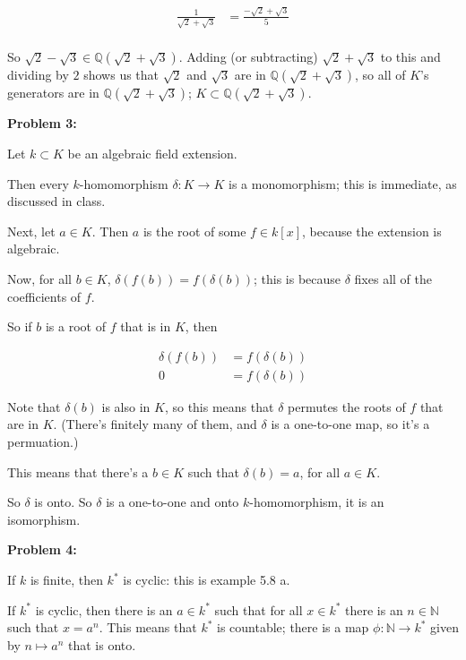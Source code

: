 \documentclass[a4paper,12pt]{article}
\newcommand{\shunt}{\vspace{20mm}}
\newcommand{\de}{\delta}
\newcommand{\N}{\mathbb{N}}
\newcommand{\Q}{\mathbb{Q}}
\begin{document}
\begin{align*}
\frac{1}{\sqrt{2}+\sqrt{3}} &= \frac{-\sqrt{2}+\sqrt{3}}{5}\\
\end{align*}

So $\sqrt{2}-\sqrt{3} \in \Q(\sqrt{2}+\sqrt{3})$. Adding (or subtracting) $\sqrt{2}+\sqrt{3}$ to this and dividing by $2$ shows us that $\sqrt{2}$ and $\sqrt{3}$ are in $\Q(\sqrt{2}+\sqrt{3})$, so all of $K$'s generators are in $\Q(\sqrt{2}+\sqrt{3})$; $K \subset \Q(\sqrt{2}+\sqrt{3})$.

\shunt

{\bf Problem 3:} 

Let $k \subset K$ be an algebraic field extension.

Then every $k$-homomorphism $\de: K \to K$ is a monomorphism; this is immediate, as discussed in class.

Next, let $a \in K$. Then $a$ is the root of some $f \in k[x]$, because the extension is algebraic.

Now, for all $b \in K$, $\de(f(b)) = f(\de(b))$; this is because $\de$ fixes all of the coefficients of $f$.

So if $b$ is a root of $f$ that is in $K$, then 

\begin{align*}
\de(f(b)) &= f(\de(b)) \\
0 &= f(\de(b))
\end{align*}

Note that $\de(b)$ is also in $K$, so this means that $\de$ permutes the roots of $f$ that are in $K$. (There's finitely many of them, and $\de$ is a one-to-one map, so it's a permuation.)

This means that there's a $b \in K$ such that $\de(b) = a$, for all $a \in K$.

So $\de$ is onto. So $\de$ is a one-to-one and onto $k$-homomorphism, it is an isomorphism.


\shunt

{\bf Problem 4:} 

If $k$ is finite, then $k^*$ is cyclic: this is example 5.8 a. %

If $k^*$ is cyclic, then there is an $a \in k^*$ such that for all $x \in k^*$ there is an $n \in \N$ such that $x = a^n$. This means that $k^*$ is countable; there is a map $\phi: \N \to k^*$ given by $n \mapsto a^n$ that is onto.
\end{document}
